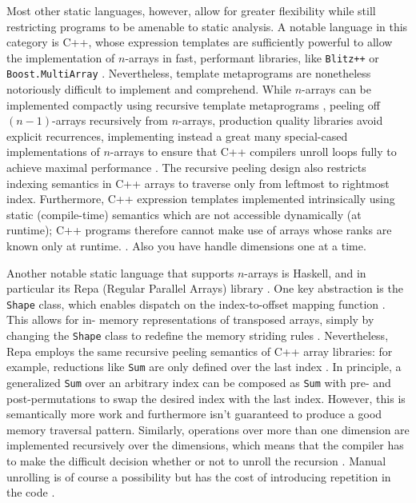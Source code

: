 \documentclass[preprint]{sigplanconf}
\newcommand{\code}[1]{\texttt{#1}}
\begin{document}
Most other static languages, however, allow for greater flexibility while
still restricting programs to be amenable to static analysis. A notable
language in this category is C++, whose expression templates are sufficiently
powerful to allow the implementation of $n$-arrays in fast, performant
libraries, like \code{Blitz++} \cite{Veldhuizen:1998ab} or
\code{Boost.MultiArray} \cite{Garcia:2005ma}.  Nevertheless, template
metaprograms are nonetheless notoriously difficult to implement and
comprehend. While $n$-arrays can be implemented compactly using recursive
template metaprograms \cite{Bavestrelli:2000ct}, peeling off $(n-1)$-arrays
recursively from $n$-arrays, production quality libraries avoid explicit
recurrences, implementing instead a great many special-cased implementations
of $n$-arrays to ensure that C++ compilers unroll loops fully to achieve
maximal performance \cite{Garcia:2005ma}. The recursive peeling design also
restricts indexing semantics in C++ arrays to traverse only from  leftmost to
rightmost index. Furthermore, C++ expression templates implemented
intrinsically using static (compile-time) semantics which are not accessible
dynamically (at runtime); C++ programs therefore cannot make use of arrays
whose ranks are known only at runtime. . Also you have handle dimensions one
at a time.

Another notable static language that supports $n$-arrays is Haskell, and in
particular its Repa (Regular Parallel Arrays) library \cite{Keller:2010rs}.
One key abstraction is the \code{Shape} class, which enables dispatch on the
index-to-offset mapping function \cite{Keller:2010rs}. This allows for in-
memory representations of transposed arrays, simply by changing the
\code{Shape} class to redefine the memory striding rules \cite{Keller:2010rs}.
Nevertheless, Repa employs the same recursive peeling semantics of C++ array
libraries: for example, reductions like \code{Sum} are only defined
over the last index \cite{Keller:2010rs}. In principle, a generalized
\code{Sum} over an arbitrary index can be composed as \code{Sum} with pre- and
post-permutations to swap the desired index with the last index. However,
this is semantically more work and furthermore isn't guaranteed to produce a
good memory traversal pattern. Similarly, operations over more than one
dimension are implemented recursively over the dimensions, which means that
the compiler has to make the difficult decision whether or not to unroll the
recursion \cite{Lippmeier:2011ep}. Manual unrolling is of course a possibility
but has the cost of introducing repetition in the code
\cite{Lippmeier:2012gp}.
\end{document}
